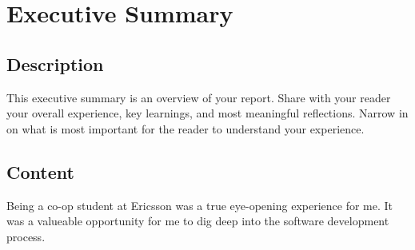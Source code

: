 \newpage
\section{Executive Summary}

\subsection{Description}

This executive summary is an overview of your report. Share with your reader your overall experience, key learnings, and most meaningful reflections. Narrow in on what is most important for the reader to understand your experience.

\subsection{Content}

Being a co-op student at Ericsson was a true eye-opening experience for me.
It was a valueable opportunity for me to dig deep into the software development process.




